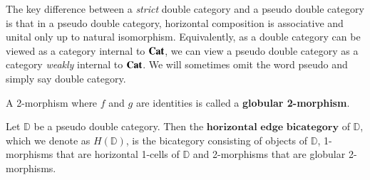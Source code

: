 \documentclass[oneside]{amsart}
\newcommand{\lD}{\ensuremath{\mathbb{D}}}
\theoremstyle{definition}
\theoremstyle{remark}
\numberwithin{equation}{section}
\begin{document}
The key difference between a \emph{strict} double category and a pseudo double category is that in a pseudo double category, horizontal composition is associative and unital only up to natural isomorphism. Equivalently, as a double category can be viewed as a category internal to $\bold{Cat}$, we can view a pseudo double category as a category \emph{weakly} internal to $\bold{Cat}$. We will sometimes omit the word pseudo and simply say double category.

\begin{defn}
A 2-morphism where $f$ and $g$ are identities is called a \textbf{globular 2-morphism}.
\end{defn}

\begin{defn}
Let $\lD$ be a pseudo double category. Then the $\textbf{horizontal edge bicategory}$ of $\lD$, which we denote as $H(\lD)$, is the bicategory consisting of objects of $\lD$, 1-morphisms that are horizontal 1-cells of $\lD$ and 2-morphisms that are globular 2-morphisms.
\end{defn}
\end{document}
